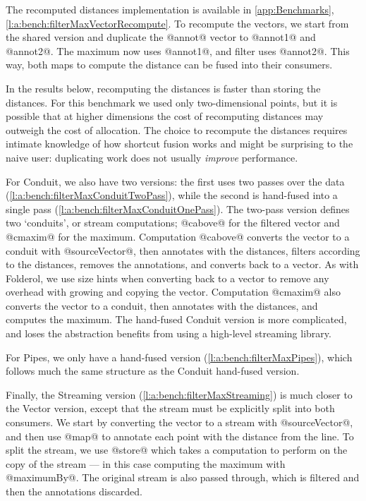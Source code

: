 The recomputed distances implementation is available in \cref{app:Benchmarks}, \cref{l:a:bench:filterMaxVectorRecompute}.
To recompute the vectors, we start from the shared version and duplicate the @annot@ vector to @annot1@ and @annot2@. The maximum now uses @annot1@, and filter uses @annot2@.
This way, both maps to compute the distance can be fused into their consumers.

In the results below, recomputing the distances is faster than storing the distances.
For this benchmark we used only two-dimensional points, but it is possible that at higher dimensions the cost of recomputing distances may outweigh the cost of allocation.
The choice to recompute the distances requires intimate knowledge of how shortcut fusion works and might be surprising to the naive user: duplicating work does not usually \emph{improve} performance.

For Conduit, we also have two versions: the first uses two passes over the data (\cref{l:a:bench:filterMaxConduitTwoPass}), while the second is hand-fused into a single pass (\cref{l:a:bench:filterMaxConduitOnePass}).
The two-pass version defines two `conduits', or stream computations; @cabove@ for the filtered vector and @cmaxim@ for the maximum.
Computation @cabove@ converts the vector to a conduit with @sourceVector@, then annotates with the distances, filters according to the distances, removes the annotations, and converts back to a vector.
As with Folderol, we use size hints when converting back to a vector to remove any overhead with growing and copying the vector.
Computation @cmaxim@ also converts the vector to a conduit, then annotates with the distances, and computes the maximum.
The hand-fused Conduit version is more complicated, and loses the abstraction benefits from using a high-level streaming library.

For Pipes, we only have a hand-fused version (\cref{l:a:bench:filterMaxPipes}), which follows much the same structure as the Conduit hand-fused version.

Finally, the Streaming version (\cref{l:a:bench:filterMaxStreaming}) is much closer to the Vector version, except that the stream must be explicitly split into both consumers.
We start by converting the vector to a stream with @sourceVector@, and then use @map@ to annotate each point with the distance from the line.
To split the stream, we use @store@ which takes a computation to perform on the copy of the stream --- in this case computing the maximum with @maximumBy@.
The original stream is also passed through, which is filtered and then the annotations discarded.

